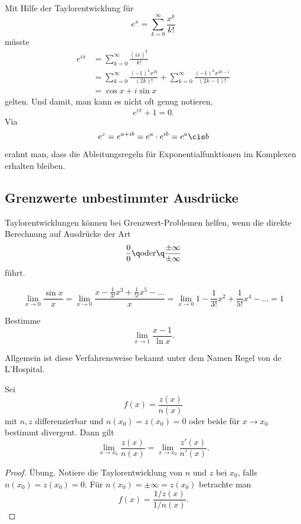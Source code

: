\documentclass[%
draft,
11pt,%
twoside,%
titlepage,%
german,%
headsepline%
]{scrartcl}
\begin{document}
Mit Hilfe der Taylorentwicklung f\"ur
$$e^x=\sum_{k=0}^\infty\frac{x^k}{k!}$$
m\"usste
\begin{align*}
e^{ix}&=\sum_{k=0}^\infty\frac{(ix)^k}{k!}\\
&=\sum_{k=0}^\infty\frac{(-1)^kx^{2k}}{(2k)!}+\sum_{k=0}^\infty\frac{(-1)^kx^{2k-1}}{(2k-1)!}\\
&=\cos x+i\sin x
\end{align*}
gelten. Und damit, man kann es nicht oft genug notieren,
$$e^{i\pi}+1=0.$$
Via
$$e^z=e^{a+ib}=e^a\cdot e^{ib}=e^a\cis b$$
erahnt man, dass die Ableitungsregeln f\"ur Exponentialfunktionen im Komplexen erhalten bleiben.

\subsection{Grenzwerte unbestimmter Ausdr\"ucke}

Taylorentwicklungen k\"onnen bei Grenzwert-Problemen helfen, wenn die direkte Berechnung auf Ausdr\"ucke der Art
$$\frac{0}{0}\q\text{oder}\q \frac{\pm\infty}{\pm\infty}$$
f\"uhrt.

\begin{bsp}
$$
\lim_{x\to0}\frac{\sin x}{x}=\lim_{x\to0}\frac{x-\frac{1}{3!}x^3+\frac{1}{5!}x^5-\dots}{x}=\lim_{x\to0}1-\frac{1}{3!}x^2+\frac{1}{5!}x^4-\dots=1
$$
\end{bsp}

\begin{ueb}
Bestimme
$$\lim_{x\to1}\frac{x-1}{\ln x}.$$
\end{ueb}

\noindent Allgemein ist diese Verfahrensweise bekannt unter dem Namen \glqq Regel von de L'Hospital\grqq.

\begin{satz}
Sei
$$f(x)=\frac{z(x)}{n(x)}$$
mit $n,z$ differenzierbar und $n(x_0)=z(x_0)=0$ oder beide f\"ur $x\to x_0$ bestimmt divergent. Dann gilt
$$\lim_{x\to x_0}\frac{z(x)}{n(x)}=\lim_{x\to x_0}\frac{z'(x)}{n'(x)}.$$
\end{satz}

\begin{proof}
\"Ubung. Notiere die Taylorentwicklung von $n$ und $z$ bei $x_0$, falls $n(x_0)=z(x_0)=0$. F\"ur $n(x_0)=\pm\infty=z(x_0)$ betrachte man
$$f(x)=\frac{1/z(x)}{1/n(x)}.$$
\end{proof}
\end{document}
